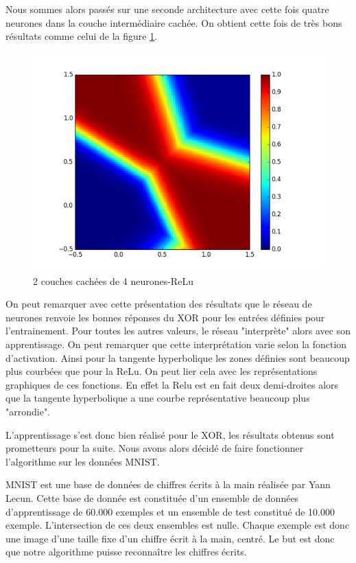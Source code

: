 \documentclass{report}
\theoremstyle{plain}
\theoremstyle{definition}
\theoremstyle{remark}
\begin{document}
Nous sommes alors passés sur une seconde architecture avec cette fois quatre neurones dans la couche intermédiaire cachée. On obtient cette fois de très bons résultats comme celui de la figure \ref{xor_relu_2_4}.

\begin{figure}[!h]
\begin{center}
\includegraphics[scale=0.6]{images/xor_relu_2_4.png}
\caption{2 couches cachées de 4 neurones-ReLu}
\label{xor_relu_2_4}
\end{center}
\end{figure}

On peut remarquer avec cette présentation des résultats que le réseau de neurones renvoie les bonnes réponses du XOR pour les entrées définies pour l'entrainement. Pour toutes les autres valeurs,  le réseau "interprète" alors avec son apprentissage. On peut remarquer que cette interprétation varie selon la fonction d'activation. Ainsi pour la tangente hyperbolique les zones définies sont beaucoup plus courbées que pour la ReLu. On peut lier cela avec les représentations graphiques de ces fonctions. En effet la Relu est en fait deux demi-droites alors que la tangente hyperbolique a une courbe représentative beaucoup plus "arrondie".

L'apprentissage s'est donc bien réalisé pour le XOR, les résultats obtenus sont prometteurs pour la suite. Nous avons alors décidé de faire fonctionner l'algorithme sur les données MNIST.

MNIST est une base de données de chiffres écrits à la main réalisée par Yann Lecun. Cette base de donnée est constituée d'un ensemble de données d'apprentissage de 60.000 exemples et un ensemble de test constitué de 10.000 exemple. L'intersection de ces deux ensembles est nulle. Chaque exemple est donc une image d'une taille fixe d'un chiffre écrit à la main, centré. Le but est donc que notre algorithme puisse reconnaître les chiffres écrits.
\end{document}
